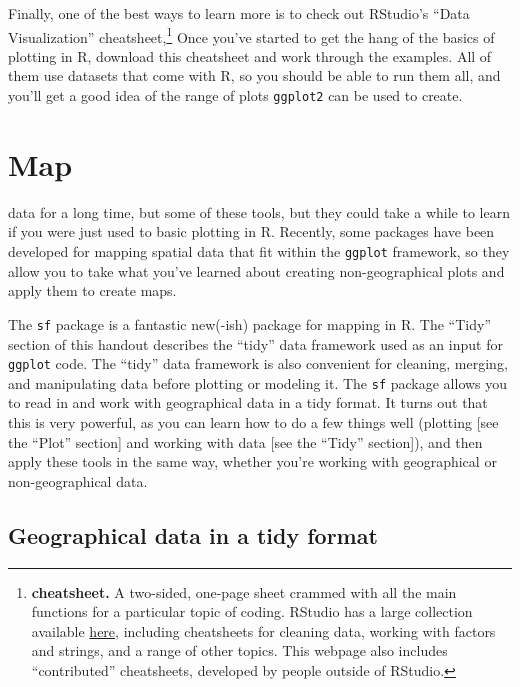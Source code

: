 \documentclass[]{tufte-book}
\begin{document}
Finally, one of the best ways to learn more is to check out RStudio's ``Data Visualization''
cheatsheet,\footnote{\textbf{cheatsheet.} A two-sided, one-page sheet crammed with all the main functions
  for a particular topic of coding. RStudio has a large collection available
  \href{https://www.rstudio.com/resources/cheatsheets/}{here}, including cheatsheets for cleaning
  data, working with factors and strings, and a range of other topics. This webpage also includes
  ``contributed'' cheatsheets, developed by people outside of RStudio.} Once you've started to
get the hang of the basics of plotting in R, download this cheatsheet and work through the
examples. All of them use datasets that come with R, so you should be able to run them all,
and you'll get a good idea of the range of plots \texttt{ggplot2} can be used to create.

\hypertarget{map}{%
\chapter{Map}\label{map}}

 data for a long time, but some of these
tools, but they could take a while to learn if you were just used to basic plotting
in R. Recently, some packages have been developed for mapping spatial data that fit within
the \texttt{ggplot} framework, so they allow you to take what you've learned about creating non-geographical
plots and apply them to create maps.

The \texttt{sf} package \citep{R-sf} is a fantastic new(-ish) package for mapping in R. The ``Tidy'' section
of this handout describes the ``tidy'' data framework used as an input for \texttt{ggplot} code. The
``tidy'' data framework is also convenient for cleaning, merging, and manipulating data
before plotting or modeling it. The \texttt{sf} package allows you to read in and work with geographical
data in a tidy format. It turns out that this is very powerful, as you can learn how to do a
few things well (plotting {[}see the ``Plot'' section{]} and working with data {[}see the ``Tidy'' section{]}),
and then apply these tools in the same way, whether you're working with geographical or
non-geographical data.

\hypertarget{geographical-data-in-a-tidy-format}{%
\section{Geographical data in a tidy format}\label{geographical-data-in-a-tidy-format}}
\end{document}
